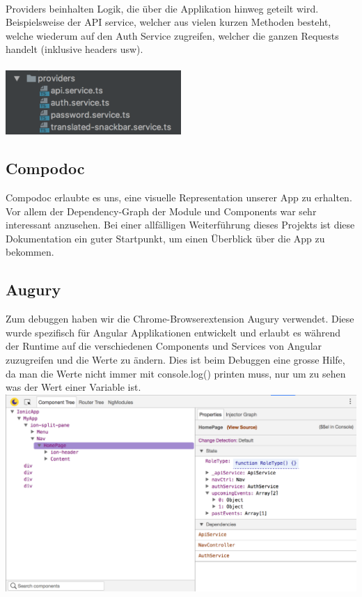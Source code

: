 \documentclass[11pt]{article} %
\begin{document}
\\
Providers beinhalten Logik, die über die Applikation hinweg geteilt wird. Beispielsweise der API service, welcher aus vielen kurzen Methoden besteht, welche wiederum auf den Auth Service zugreifen, welcher die ganzen Requests handelt (inklusive headers usw).
\\
\\
\includegraphics[width=0.5\textwidth]{ionic/src-providers}

\subsection{Compodoc}
Compodoc erlaubte es uns, eine visuelle Representation unserer App zu erhalten. Vor allem der Dependency-Graph der Module und Components war sehr interessant anzusehen. Bei einer allfälligen Weiterführung dieses Projekts ist diese Dokumentation ein guter Startpunkt, um einen Überblick über die App zu bekommen.

\subsection{Augury}
Zum debuggen haben wir die Chrome-Browserextension Augury verwendet. Diese wurde spezifisch für Angular Applikationen entwickelt und erlaubt es während der Runtime auf die verschiedenen Components und Services von Angular zuzugreifen und die Werte zu ändern. Dies ist beim Debuggen eine grosse Hilfe, da man die Werte nicht immer mit console.log() printen muss, nur um zu sehen was der Wert einer Variable ist.
\\
\includegraphics[width=1.0\textwidth]{ionic/augury}
\end{document}
